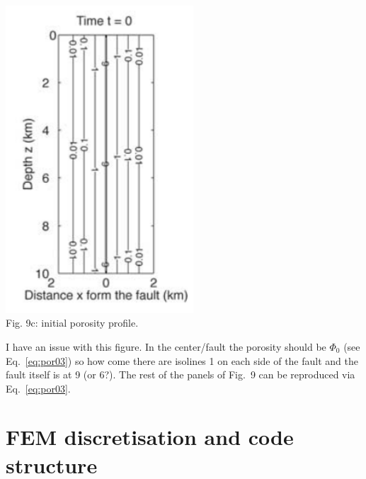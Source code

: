 \begin{center}
\includegraphics[width=7cm]{python_codes/fieldstone_126/images/grfr03b}\\
{\captionfont Fig. 9c: initial porosity profile.}
\end{center}

{\color{red} I have an issue with this figure. In the center/fault the porosity
should be $\Phi_0$ (see Eq.~\eqref{eq:por03}) so how come 
there are isolines 1 on each side of the fault and the fault itself is at 9 (or 6?).}
The rest of the panels of Fig.~9 can be reproduced via Eq.~\eqref{eq:por03}.


\newpage
\section*{FEM discretisation and code structure}

